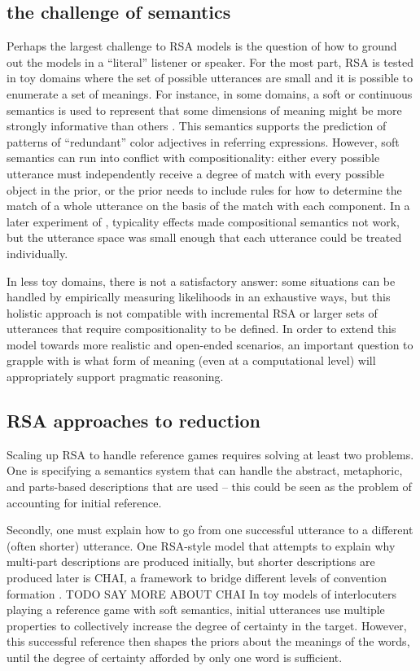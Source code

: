 \documentclass[]{article}
\begin{document}
\subsection{the challenge of semantics}
Perhaps the largest challenge to RSA models is the question of how to ground out the models in a ``literal'' listener or speaker. For the most part, RSA is tested in toy domains where the set of possible utterances are small and it is possible to enumerate a set of meanings. For instance, in some domains, a soft or continuous semantics is used to represent that some dimensions of meaning might be more strongly informative than others \cite{degen20200406}. This semantics supports the prediction of patterns of ``redundant'' color adjectives in referring expressions. However, soft semantics can run into conflict with compositionality: either every possible utterance must independently receive a degree of match with every possible object in the prior, or the prior needs to include rules for how to determine the match of a whole utterance on the basis of the match with each component. In a later experiment of \cite{degen20200406}, typicality effects made compositional semantics not work, but the utterance space was small enough that each utterance could be treated individually. 

 In less toy domains, there is not a satisfactory answer: some situations can be handled by empirically measuring likelihoods in an exhaustive ways, but this holistic approach is not compatible with incremental RSA or larger sets of utterances that require compositionality to be defined. In order to extend this model towards more realistic and open-ended scenarios, an important question to grapple with is what form of meaning (even at a computational level) will appropriately support pragmatic reasoning. 

\subsection{RSA approaches to reduction}
Scaling up RSA to handle reference games requires solving at least two problems. One is specifying a semantics system that can handle the abstract, metaphoric, and parts-based descriptions that are used -- this could be seen as the problem of accounting for initial reference. 

Secondly, one must explain how to go from one successful utterance to a different (often shorter) utterance. One RSA-style model that attempts to explain why multi-part descriptions are produced initially, but shorter descriptions are produced later is CHAI,  a framework to bridge different levels of convention formation \cite{hawkins2021}. TODO SAY MORE ABOUT CHAI In toy models of interlocuters playing a reference game with soft semantics, initial utterances use multiple properties to collectively increase the degree of certainty in the target. However, this successful reference then shapes the priors about the meanings of the words, until the degree of certainty afforded by only one word is sufficient. 
\end{document}
